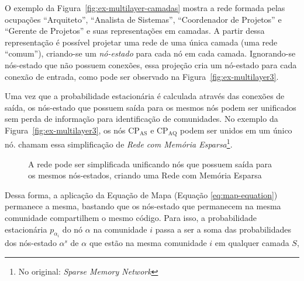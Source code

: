 \documentclass[12pt,a4paper]{article}
\begin{document}
O exemplo da Figura~\ref{fig:ex-multilayer-camadas} mostra a rede formada pelas ocupações \enquote{Arquiteto}, \enquote{Analista de Sistemas}, \enquote{Coordenador de Projetos} e \enquote{Gerente de Projetos} e suas representações em camadas. A partir dessa representação é possível projetar uma rede de uma única camada (uma rede \enquote{comum}), criando-se um \textit{nó-estado} para cada nó em cada camada. Ignorando-se nós-estado que não possuem conexões, essa projeção cria um nó-estado para cada conexão de entrada, como pode ser observado na Figura~\ref{fig:ex-multilayer3}.

Uma vez que a probabilidade estacionária é calculada através das conexões de saída, os nós-estado que possuem saída para os mesmos nós podem ser unificados sem perda de informação para identificação de comunidades. No exemplo da Figura~\ref{fig:ex-multilayer3}, os nós $\text{CP}_\text{AS}$ e $\text{CP}_\text{AQ}$ podem ser unidos em um único nó.  chamam essa simplificação de \textit{Rede com Memória Esparsa}\footnote{No original: \textit{Sparse Memory Network}}.

\begin{figure}[htb]
    \centering
    \caption{A rede pode ser simplificada unificando nós que possuem saída para os mesmos nós-estados, criando uma Rede com Memória Esparsa~\cite{Edler2017-kt}}
    \label{fig:ex-multilayer-memoria}
\end{figure}

Dessa forma, a aplicação da Equação de Mapa (Equação \ref{eq:map-equation}) permanece a mesma, bastando que os nós-estado que permanecem na mesma comunidade compartilhem o mesmo código. Para isso, a probabilidade estacionária $p_{\alpha_i}$ do nó $\alpha$ na comunidade $i$ passa a ser a soma das probabilidades dos nós-estado $\alpha^s$ de $\alpha$ que estão na mesma comunidade $i$ em qualquer camada $S$,
\end{document}
